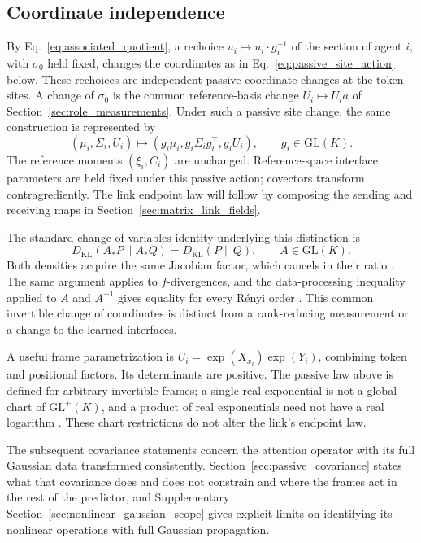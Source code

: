 \documentclass[twoside,11pt]{article}
\begin{document}
\subsection{Coordinate independence}
\label{sec:glk_invariance}

By Eq.~\eqref{eq:associated_quotient}, a rechoice \(u_i\mapsto u_i\cdot g_i^{-1}\) of the section of agent \(i\), with \(\sigma_0\) held fixed, changes the coordinates as in Eq.~\eqref{eq:passive_site_action} below. These rechoices are independent passive coordinate changes at the token sites. A change of \(\sigma_0\) is the common reference-basis change \(U_i\mapsto U_ia\) of Section~\ref{sec:role_measurements}. Under such a passive site change, the same construction is represented by
\begin{equation}
(\mu_i,\Sigma_i,U_i)\mapsto
(g_i\mu_i,g_i\Sigma_i g_i^\top,g_iU_i),
\qquad g_i\in\mathrm{GL}(K).
\label{eq:passive_site_action}
\end{equation}
The reference moments \((\xi_i,C_i)\) are unchanged. Reference-space interface parameters are held fixed under this passive action; covectors transform contragrediently. The link endpoint law will follow by composing the sending and receiving maps in Section~\ref{sec:matrix_link_fields}.

The standard change-of-variables identity underlying this distinction is
\begin{equation}
D_{\mathrm{KL}}(A_*P\|A_*Q)=D_{\mathrm{KL}}(P\|Q),
\qquad A\in\mathrm{GL}(K).
\label{eq:glk_invariance}
\end{equation}
Both densities acquire the same Jacobian factor, which cancels in their ratio \citep{Amari2016}. The same argument applies to \(f\)-divergences, and the data-processing inequality applied to \(A\) and \(A^{-1}\) gives equality for every R\'enyi order \citep[Thm.~9]{vanErvenHarremoes2014}. This common invertible change of coordinates is distinct from a rank-reducing measurement or a change to the learned interfaces.

A useful frame parametrization is \(U_i=\exp(X_{x_i})\exp(Y_i)\), combining token and positional factors. Its determinants are positive. The passive law above is defined for arbitrary invertible frames; a single real exponential is not a global chart of \(\mathrm{GL}^+(K)\), and a product of real exponentials need not have a real logarithm \citep{culver1966existence}. These chart restrictions do not alter the link's endpoint law.

The subsequent covariance statements concern the attention operator with its full Gaussian data transformed consistently. Section~\ref{sec:passive_covariance} states what that covariance does and does not constrain and where the frames act in the rest of the predictor, and Supplementary Section~\ref{sec:nonlinear_gaussian_scope} gives explicit limits on identifying its nonlinear operations with full Gaussian propagation.
\end{document}
